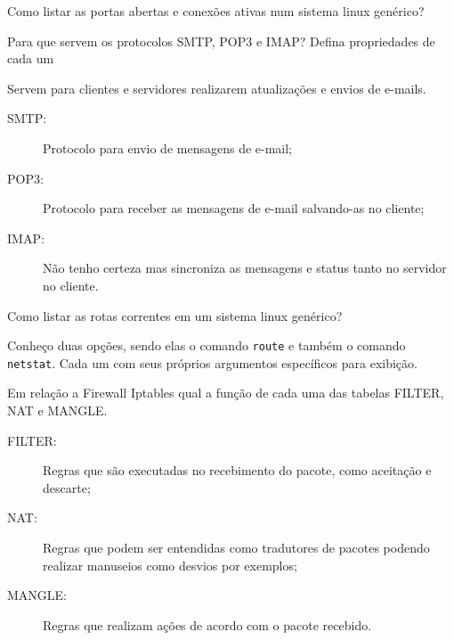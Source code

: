 \documentclass{ximera}
\begin{document}
\begin{example}
Como listar as portas abertas e conexões ativas num sistema linux genérico?
\begin{explanation}
\end{explanation}
\end{example}


\begin{example}
Para que servem os protocolos SMTP, POP3 e IMAP? Defina propriedades de cada um
\begin{explanation}
Servem para clientes e servidores realizarem atualizações e envios de e-mails.
\begin{description}
    \item[SMTP:] Protocolo para envio de mensagens de e-mail;
    \item[POP3:] Protocolo para receber as mensagens de e-mail salvando-as no cliente;
    \item[IMAP:] Não tenho certeza mas sincroniza as mensagens e status tanto no servidor no cliente.
\end{description}
\end{explanation}
\end{example}


\begin{example}
Como listar as rotas correntes em um sistema linux genérico?
\begin{explanation}
Conheço duas opções, sendo elas o comando \texttt{route} e também o comando \texttt{netstat}. Cada um com seus próprios argumentos específicos para exibição.
\end{explanation}
\end{example}


\begin{example}
Em relação a Firewall Iptables qual a função de cada uma das tabelas FILTER, NAT e MANGLE.
\begin{explanation}

\begin{description}
    \item[FILTER:] Regras que são executadas no recebimento do pacote, como aceitação e descarte;
    \item[NAT:] Regras que podem ser entendidas como tradutores de pacotes podendo realizar manuseios como desvios por exemplos;
    \item[MANGLE:] Regras que realizam ações de acordo com o pacote recebido.
\end{description}
\end{explanation}
\end{example}
\end{document}
